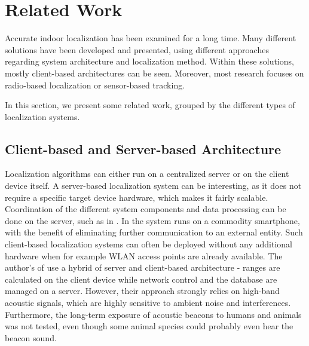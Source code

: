 
\chapter{Related Work} %

\label{Chapter2} %
Accurate indoor localization has been examined for a long time. Many different solutions have been developed and presented, using different approaches regarding system architecture and localization method. Within these solutions, mostly client-based architectures can be seen. Moreover, most research focuses on radio-based localization or sensor-based tracking.

In this section, we present some related work, grouped by the different types of localization systems.


\section{Client-based and Server-based Architecture}
Localization algorithms can either run on a centralized server or on the client device itself. A server-based localization system can be interesting, as it does not require a specific target device hardware, which makes it fairly scalable. Coordination of the different system components and data processing can be done on the server, such as in \cite{Delmastro}.
In \cite{Carrera} the system runs on a commodity smartphone, with the benefit of eliminating further communication to an external entity. Such client-based localization systems can often be deployed without any additional hardware when for example WLAN access points are already available. The author's of \cite{Guoguo} use a hybrid of server and client-based architecture - ranges are calculated on the client device while network control and the database are managed on a server. However, their approach strongly relies on high-band acoustic signals, which are highly sensitive to ambient noise and interferences. Furthermore, the long-term exposure of acoustic beacons to humans and animals was not tested, even though some animal species could probably even hear the beacon sound.

